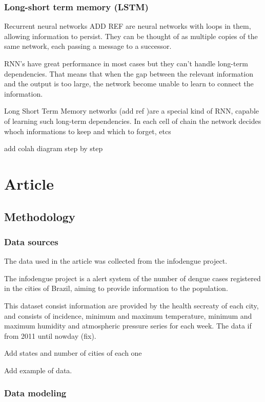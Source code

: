 \documentclass[12pt]{report}
\begin{document}
\subsection{Long-short term memory (LSTM)}

Recurrent neural networks ADD REF are neural networks with loops in them, allowing information
to persist. They can be thought of as multiple copies of the same network, each passing a message
to a successor.

RNN's have great performance  in most cases but they can't handle long-term dependencies. That 
means that when the gap between the relevant information and the output is too large, the network
become unable to learn to connect the information.

Long Short Term Memory networks (add ref )are a special kind of RNN, capable of learning
such long-term dependencies. In each cell of chain the network decides whoch informations to keep
and which to forget, etcs

add colah diagram step by step

\newpage
\chapter{Article}

\section{Methodology}


\subsection{Data sources}
The data used in the article was collected from the infodengue project. 

The infodengue project \citep{codeco2016infodengue} is a alert system of the number of dengue cases registered in the 
cities of Brazil, aiming to provide  information to the population.

This dataset consist information are provided by the health secreaty of each city, and consists of 
incidence, minimum and maximum temperature, minimum and maximum humidity and 
atmospheric pressure series for each week. The data if from 2011 until nowday (fix).

Add states and number of cities of each one 

Add example of data.

\subsection{Data modeling}
\end{document}
